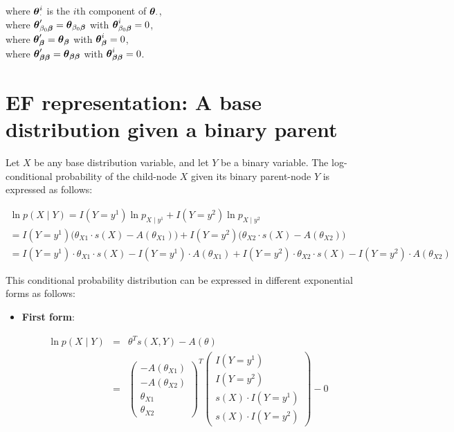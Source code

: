 \documentclass[11pt, oneside]{article}   	%
\numberwithin{figure}{section}
\numberwithin{equation}{section}
\numberwithin{table}{section}
\theoremstyle{definition}
\begin{document}
\begin{appendices}
\begin{itemize}
where $\boldsymbol \theta_{\cdot}^i$ is the $i$th component of $\boldsymbol \theta_{\cdot}$,\\
where $\boldsymbol \theta_{\beta_0\boldsymbol \beta}' = \boldsymbol \theta_{\beta_0\boldsymbol \beta}$ with $\boldsymbol \theta_{\beta_0\boldsymbol \beta}^i = 0$,\\
where $\boldsymbol \theta_{\boldsymbol \beta}' = \boldsymbol \theta_{\boldsymbol \beta}$ with $\boldsymbol \theta_{\boldsymbol \beta}^i = 0$,\\
where $\boldsymbol \theta_{\boldsymbol \beta\boldsymbol \beta}' = \boldsymbol \theta_{\boldsymbol \beta\boldsymbol \beta}$ with $\boldsymbol \theta_{\boldsymbol \beta\boldsymbol \beta}^i = 0$.


\end{itemize}

\newpage
\section{EF representation: A base distribution given a binary parent}

Let $X$ be any base distribution variable, and let $Y$ be a binary variable. The log-conditional probability of the child-node $X$ given its binary parent-node $Y$ is expressed as follows:

\begin{eqnarray*}
\ln p(X \mid Y) =  I(Y= y^1) \ln p_{X \mid y^1} + I(Y= y^2) \ln p_{X \mid y^2} ~~~~~~~~~~~~~~~~~~~~~~~~~~~~~~~~~~~~~~~~~~~~~~~~~~~~~\\
= I(Y= y^1)  \Big(\theta_{X1} \cdot s(X) - A(\theta_{X1})\Big) +  I(Y= y^2) \Big(\theta_{X2} \cdot s(X) - A(\theta_{X2})\Big) ~~~~~~~~~~~~~~~~~~~~~~~~~~~~\\
= I(Y=y^1) \cdot \theta_{X1} \cdot s(X) - I(Y=y^1) \cdot A(\theta_{X1}) +  I(Y=y^2) \cdot \theta_{X2} \cdot s(X) - I(Y=y^2) \cdot A(\theta_{X2})
\end{eqnarray*}

This conditional probability distribution can be expressed in different exponential forms as follows:

\begin{itemize}

\item \textbf{First form}:

\begin{eqnarray*}
\ln p(X \mid Y) &=& \theta^T s(X,Y) - A(\theta) \\
&=&
\begin{pmatrix}
- A(\theta_{X1}) \\
- A(\theta_{X2}) \\
\theta_{X1} \\
\theta_{X2}
\end{pmatrix}^T
\begin{pmatrix}
I(Y=y^1) \\
I(Y=y^2) \\
s(X) \cdot I(Y=y^1) \\
s(X) \cdot I(Y=y^2)
\end{pmatrix}
- 0 
\end{eqnarray*}


\end{itemize}
\end{appendices}
\end{document}
